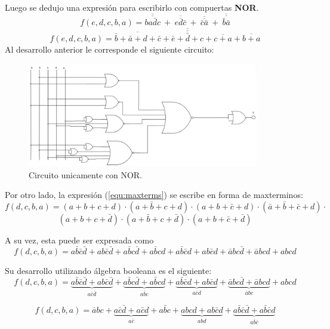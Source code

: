 \documentclass[a4paper]{article}
\begin{document}
\begin{center}
Luego se dedujo una expresión para escribirlo con compuertas \textbf{NOR}.
\[
	f \left( e,d,c,b,a \right) = \overline{\overline{b a \bar{d} c }} \ + \  \overline{\overline{ e d \bar{c}}} \ + \ \overline{\overline{\bar{c} \bar{a}}} \ + \ \overline{\overline{ \bar{b} \bar{a}}}
\]
\[
	f \left( e,d,c,b,a \right) =\overline{\overline{\overline{\bar{b}+\bar{a}+d+\bar{c}}+\overline{\bar{e}+\bar{d}+c}+\overline{c+a}+\overline{b+a}}}
\]
Al desarrollo anterior le corresponde el siguiente circuito:
\begin{figure}[H]
	\centering
	\includegraphics[width=0.9\textwidth]{Circuito4.png}
	\caption{Circuito unicamente con NOR.}
	\label{fig:circ4}
\end{figure}

Por otro lado, la expresión (\ref{equ:maxterms}) se escribe en forma de maxterminos:
\[
	f \left( d,c,b,a \right) = \left( a + b + c + d \right) \cdot \left( a + \bar{b} + c + d\right) \cdot \left( a + b+ \bar{c} + d \right) \cdot \left( \bar{a} + \bar{b} + \bar{c} + d \right) \cdot
\]
\[
	\left( a + b + c + \bar{d} \right) \cdot \left( a + \bar{b} + c + \bar{d} \right) \cdot \left( a + b + \bar{c} +\bar{d} \right)
\]

A su vez, esta puede ser expresada como
\[
	f \left( d,c,b,a \right) = a\bar{b}\bar{c}\bar{d} + ab\bar{c}\bar{d} +
	a\bar{b}c\bar{d} + a\bar{b}cd + a\bar{b}\bar{c}d + ab\bar{c}d + \bar{a}bc\bar{d} + \bar{a}bcd + abcd
\]

Su desarrollo utilizando álgebra booleana es el siguiente:
\[
	f \left( d,c,b,a \right) = \underbrace{a\bar{b}\bar{c}\bar{d} + ab\bar{c}\bar{d}}_{a\bar{c}\bar{d}} +
	\underbrace{a\bar{b}c\bar{d} + a\bar{b}cd}_{a\bar{b}c} + \underbrace{a\bar{b}\bar{c}d + ab\bar{c}d}_{a\bar{c}d} + \underbrace{\bar{a}bc\bar{d} + \bar{a}bcd}_{\bar{a}bc} + abcd
\]

\[
	f \left( d,c,b,a \right) = \bar{a}bc + \underbrace{a\bar{c}\bar{d} + a\bar{c}d}_{a\bar{c}} + a\bar{b}c + \underbrace{abcd + ab\bar{c}d}_{abd} + \underbrace{a\bar{b}\bar{c}\bar{d} + a\bar{b}\bar{c}d}_{a\bar{b}\bar{c}} 
\]


\end{center}
\end{document}
